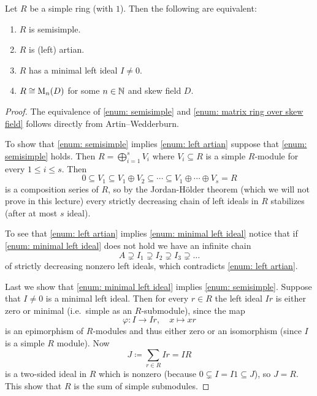 \begin{thrm}[Wedderburn]
  Let $R$ be a simple ring (with $1$). Then the following are equivalent:
  \begin{enumerate}[label=\emph{\roman*)},leftmargin=*]
    \item \label{enum: semisimple}
      $R$ is semisimple.
    \item \label{enum: left artian}
      $R$ is (left) artian.
    \item \label{enum: minimal left ideal}
      $R$ has a minimal left ideal $I \neq 0$.
    \item \label{enum: matrix ring over skew field}
      $R \cong \operatorname{M}_n(D)$ for some $n \in \mathbb{N}$ and skew field $D$.
  \end{enumerate}
\end{thrm}
\begin{proof}
  The equivalence of \ref{enum: semisimple} and \ref{enum: matrix ring over skew field} follows directly from Artin--Wedderburn.
  
  To show that \ref{enum: semisimple} implies \ref{enum: left artian} suppose that \ref{enum: semisimple} holds.
  Then $R = \bigoplus_{i=1}^s V_i$ where $V_i \subseteq R$ is a simple $R$-module for every $1 \leq i \leq s$.
  Then
  \[
              0
    \subseteq V_1
    \subseteq V_1 \oplus V_2
    \subseteq \dotsb
    \subseteq V_1 \oplus \dotsb \oplus V_s
    =         R
  \]
  is a composition series of $R$, so by the Jordan-Hölder theorem (which we will not prove in this lecture) every strictly decreasing chain of left ideals in $R$ stabilizes (after at most $s$ ideal).
  
  To see that \ref{enum: left artian} implies \ref{enum: minimal left ideal} notice that if \ref{enum: minimal left ideal} does not hold we have an infinite chain
  \[
                A
    \supsetneq  I_1
    \supsetneq  I_2
    \supsetneq  I_3
    \supsetneq  \dotso
  \]
  of strictly decreasing nonzero left ideals, which contradicts \ref{enum: left artian}.
  
  Last we show that \ref{enum: minimal left ideal} implies \ref{enum: semisimple}.
  Suppose that $I \neq 0$ is a minimal left ideal.
  Then for every $r \in R$ the left ideal $Ir$ is either zero or minimal (i.e.\ simple as an $R$-submodule), since the map
  \[
            \varphi
    \colon  I
    \to     Ir,
    \quad   x
    \mapsto xr
  \]
  is an epimorphism of $R$-modules and thus either zero or an isomorphism (since $I$ is a simple $R$ module).
  Now
  \[
              J
    \coloneqq \sum_{r \in R} Ir
    =         IR
  \]
  is a two-sided ideal in $R$ which is nonzero (because $0 \subsetneq I = I1 \subseteq J$), so $J = R$.
  This show that $R$ is the sum of simple submodules.
\end{proof}


